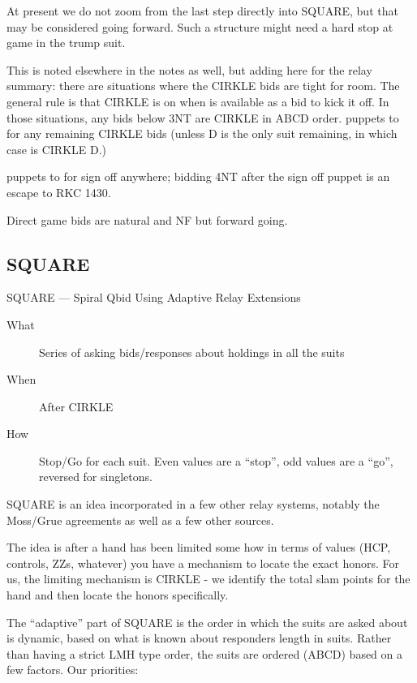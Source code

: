 \documentclass[tom-ari]{subfile}
\begin{document}
At present we do not zoom from the last step directly into SQUARE, but that may be considered going forward. Such a structure might need a hard stop at game in the trump suit.

This is noted elsewhere in the notes as well, but adding here for the relay summary: there are situations where the CIRKLE bids are tight for room.  The general rule is that CIRKLE is on when  is available as a bid to kick it off.  In those situations, any bids below 3NT are CIRKLE in ABCD order.  puppets to  for any remaining CIRKLE bids (unless D is the only suit remaining, in which case  is CIRKLE D.) 

 puppets to  for sign off anywhere; bidding 4NT after the sign off puppet is an escape to RKC 1430. 

Direct game bids are natural and NF but forward going.

\subsection{SQUARE}
\label{SQUARE}

SQUARE --- Spiral Qbid Using Adaptive Relay Extensions

\normalsize


\begin{description}
	\item[What] Series of asking bids/responses about holdings in all the suits
	\item[When] After CIRKLE
	\item[How] Stop/Go for each suit.  Even values are a ``stop'', odd values are a ``go'', reversed for singletons.  
\end{description}

SQUARE is an idea incorporated in a few other relay systems, notably the Moss/Grue agreements as well as a few other sources. 

The idea is after a hand has been limited some how in terms of values (HCP, controls, ZZs, whatever) you have a mechanism to locate the exact honors.  For us, the limiting mechanism is CIRKLE - we identify the total slam points for the hand and then locate the honors specifically.

The ``adaptive'' part of SQUARE is the order in which the suits are asked about is dynamic, based on what is known about responders length in suits.  Rather than having a strict LMH type order, the suits are ordered (ABCD) based on a few factors. Our priorities:
\end{document}
